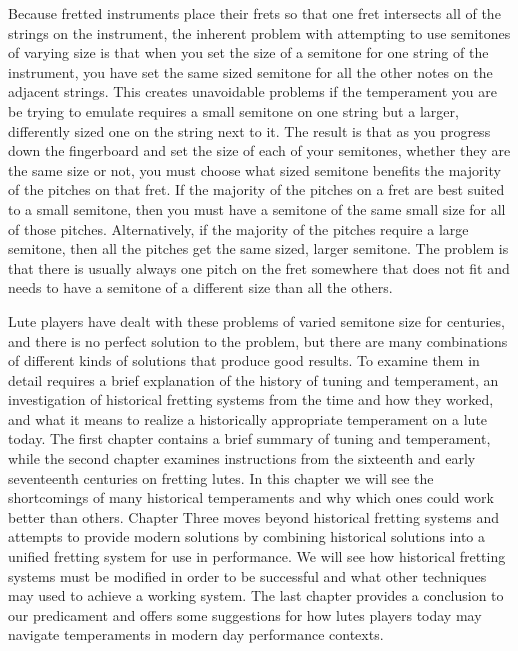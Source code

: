 Because fretted instruments place their frets so that one fret intersects all of the
strings on the instrument, the inherent problem with attempting to use semitones of
varying size is that when you set the size of a semitone for one string of the instrument,
you have set the same sized semitone for all the other notes on the adjacent strings. This
creates unavoidable problems if the temperament you are be trying to emulate requires a
small semitone on one string but a larger, differently sized one on the string next to it.
The result is that as you progress down the fingerboard and set the size of each of your
semitones, whether they are the same size or not, you must choose what sized semitone
benefits the majority of the pitches on that fret. \autocite[120]{RD:1} If the majority of
the pitches on a fret are best suited to a small semitone, then you must have a semitone
of the same small size for all of those pitches. Alternatively, if the majority of the
pitches require a large semitone, then all the pitches get the same sized, larger
semitone.  The problem is that there is usually always one pitch on the fret somewhere
that does not fit and needs to have a semitone of a different size than all the others.

Lute players have dealt with these problems of varied semitone size for centuries, and
there is no perfect solution to the problem, but there are many combinations of different
kinds of solutions that produce good results. To examine them in detail requires a brief
explanation of the history of tuning and temperament, an investigation of historical
fretting systems from the time and how they worked, and what it means to realize a
historically appropriate temperament on a lute today.  The first chapter contains a brief
summary of tuning and temperament, while the second chapter examines instructions from the
sixteenth and early seventeenth centuries on fretting lutes. In this chapter we will see
the shortcomings of many historical temperaments and why which ones could work better
than others. Chapter Three moves beyond historical fretting systems and attempts to
provide modern solutions by combining historical solutions into a unified fretting system
for use in performance.  We will see how historical fretting systems must be modified in
order to be successful and what other techniques may used to achieve a working system. The
last chapter provides a conclusion to our predicament and offers some suggestions for how
lutes players today may navigate temperaments in modern day performance contexts.
\autocite[130]{RD:1}
